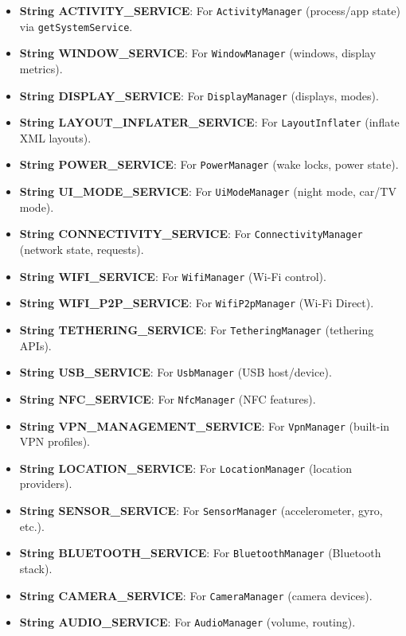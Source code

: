 \documentclass{report}
\begin{document}
\begin{itemize}
            \begin{itemize}
                \item \textbf{String ACTIVITY\_SERVICE}: For \texttt{ActivityManager} (process/app state) via \texttt{getSystemService}.
                \item \textbf{String WINDOW\_SERVICE}: For \texttt{WindowManager} (windows, display metrics).
                \item \textbf{String DISPLAY\_SERVICE}: For \texttt{DisplayManager} (displays, modes).
                \item \textbf{String LAYOUT\_INFLATER\_SERVICE}: For \texttt{LayoutInflater} (inflate XML layouts).
                \item \textbf{String POWER\_SERVICE}: For \texttt{PowerManager} (wake locks, power state).
                \item \textbf{String UI\_MODE\_SERVICE}: For \texttt{UiModeManager} (night mode, car/TV mode).

                \item \textbf{String CONNECTIVITY\_SERVICE}: For \texttt{ConnectivityManager} (network state, requests).
                \item \textbf{String WIFI\_SERVICE}: For \texttt{WifiManager} (Wi-Fi control).
                \item \textbf{String WIFI\_P2P\_SERVICE}: For \texttt{WifiP2pManager} (Wi-Fi Direct).
                \item \textbf{String TETHERING\_SERVICE}: For \texttt{TetheringManager} (tethering APIs).
                \item \textbf{String USB\_SERVICE}: For \texttt{UsbManager} (USB host/device).
                \item \textbf{String NFC\_SERVICE}: For \texttt{NfcManager} (NFC features).
                \item \textbf{String VPN\_MANAGEMENT\_SERVICE}: For \texttt{VpnManager} (built-in VPN profiles).

                \item \textbf{String LOCATION\_SERVICE}: For \texttt{LocationManager} (location providers).
                \item \textbf{String SENSOR\_SERVICE}: For \texttt{SensorManager} (accelerometer, gyro, etc.).
                \item \textbf{String BLUETOOTH\_SERVICE}: For \texttt{BluetoothManager} (Bluetooth stack).
                \item \textbf{String CAMERA\_SERVICE}: For \texttt{CameraManager} (camera devices).
                \item \textbf{String AUDIO\_SERVICE}: For \texttt{AudioManager} (volume, routing).


\end{itemize}
\end{itemize}
\end{document}
